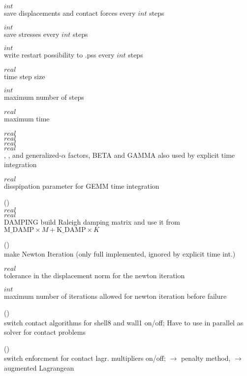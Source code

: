  $int$\\
save displacements and contact forces every $int$ steps

 $int$\\
save stresses every $int$ steps

 $int$\\
write restart possibility to .pss every $int$ steps

 $real$\\
time step size

 $int$\\
maximum number of steps

 $real$\\
maximum time

 $real$\\
 $real$\\
 $real$\\
 $real$\\
, ,  and  generalized-$\alpha$
factors, BETA and GAMMA also 
used by explicit time integration



 $real$\\
disspipation parameter for GEMM time integration

 (\kor{})\\
 $real$\\
 $real$\\
DAMPING build Raleigh damping matrix and use it from $\text{M\_DAMP}
\times M + \text{K\_DAMP} \times K$

 (\kor{}\kor{})\\
make Newton Iteration (only full implemented, ignored by explicit
time int.)

 $real$\\
tolerance in the displacement norm for the newton iteration

 $int$\\
maximum number of iterations allowed for newton iteration before failure

 (\kor{})\\
switch contact algorithms for shell8 and wall1 on/off;
Have to use  in parallel as solver for contact problems

 (\kor{})\\
switch enforcment for contact lagr. multipliers on/off;
 $\to$ penalty method,  $\to$ augmented Lagrangean

